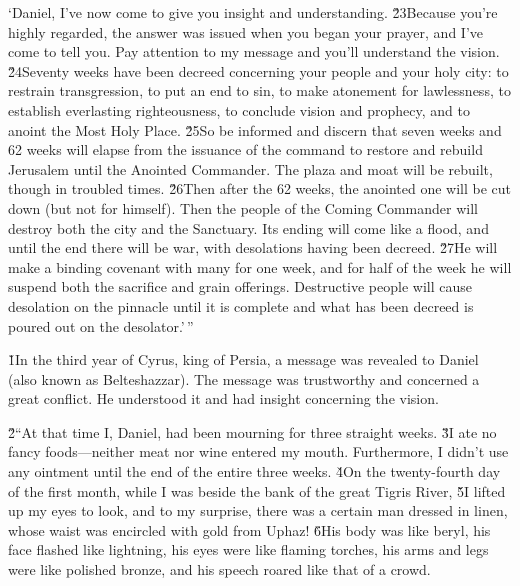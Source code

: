 \begin{poetry}
\poeml `Daniel, I've now come to give you insight and understanding. \v{23}Because you're highly regarded, the answer was issued when you began your prayer, and I've come to tell you. Pay attention to my message and you'll understand the vision. \v{24}Seventy weeks have been decreed concerning your people and your holy city: to restrain transgression, to put an end to sin, to make atonement for lawlessness, to establish everlasting righteousness, to conclude vision and prophecy, and to anoint the Most Holy Place. \v{25}So be informed and discern that seven weeks and 62 weeks will elapse from the issuance of the command to restore and rebuild Jerusalem until the Anointed Commander. The plaza and moat will be rebuilt, though in troubled times. \v{26}Then after the 62 weeks, the anointed one will be cut down (but not for himself). Then the people of the Coming Commander will destroy both the city and the Sanctuary. Its ending will come like a flood, and until the end there will be war, with desolations having been decreed. \v{27}He will make a binding covenant with many for one week, and for half of the week he will suspend both the sacrifice and grain offerings. Destructive people will cause desolation on the pinnacle until it is complete and what has been decreed is poured out on the desolator.'\,''
\end{poetry}

\v{1}In the third year of Cyrus, king of Persia, a message was revealed to Daniel (also known as Belteshazzar). The message was trustworthy and concerned a great conflict. He understood it and had insight concerning the vision.

\v{2}``At that time I, Daniel, had been mourning for three straight weeks. \v{3}I ate no fancy foods---neither meat nor wine entered my mouth. Furthermore, I didn't use any ointment until the end of the entire three weeks. \v{4}On the twenty-fourth day of the first month, while I was beside the bank of the great Tigris River, \v{5}I lifted up my eyes to look, and to my surprise, there was a certain man dressed in linen, whose waist was encircled with gold from Uphaz! \v{6}His body was like beryl, his face flashed like lightning, his eyes were like flaming torches, his arms and legs were like polished bronze, and his speech roared like that of a crowd.

